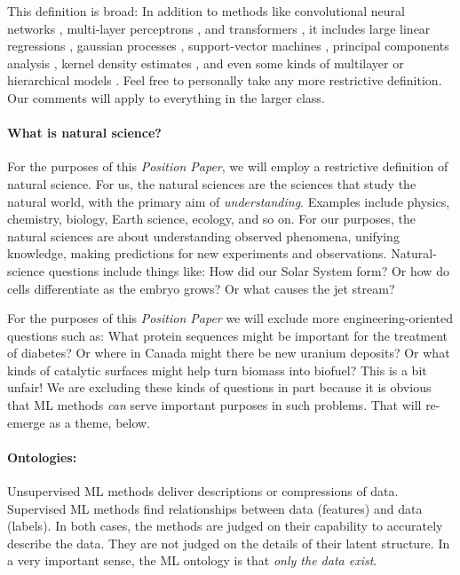 \documentclass[11pt]{article}
\newcommand{\documentname}{\textsl{Position Paper}}
\begin{document}
This definition is broad:
In addition to methods like convolutional neural networks \cite{cnn}, multi-layer perceptrons \cite{mlp}, and transformers \cite{transformer}, it includes large linear regressions \cite{linearregression}, gaussian processes \cite{gp}, support-vector machines \cite{svm}, principal components analysis \cite{pca}, kernel density estimates \cite{kde}, and even some kinds of multilayer or hierarchical models \cite{multilevel}.
Feel free to personally take any more restrictive definition.
Our comments will apply to everything in the larger class.

\paragraph{What is natural science?}
For the purposes of this \documentname, we will employ a restrictive definition of natural science.
For us, the natural sciences are the sciences that study the natural world, with the primary aim of \emph{understanding}.
Examples include physics, chemistry, biology, Earth science, ecology, and so on.
For our purposes, the natural sciences are about understanding observed phenomena, unifying knowledge, making predictions for new experiments and observations.
Natural-science questions include things like: How did our Solar System form? Or how do cells differentiate as the embryo grows? Or what causes the jet stream?

For the purposes of this \documentname{} we will exclude more engineering-oriented questions such as: What protein sequences might be important for the treatment of diabetes? Or where in Canada might there be new uranium deposits? Or what kinds of catalytic surfaces might help turn biomass into biofuel?
This is a bit unfair!
We are excluding these kinds of questions in part because it is obvious that ML methods \emph{can} serve important purposes in such problems.
That will re-emerge as a theme, below.

\paragraph{Ontologies:}
Unsupervised ML methods deliver descriptions or compressions of data.
Supervised ML methods find relationships between data (features) and data (labels).
In both cases, the methods are judged on their capability to accurately describe the data.
They are not judged on the details of their latent structure.
In a very important sense, the ML ontology is that \emph{only the data exist}.
\end{document}
